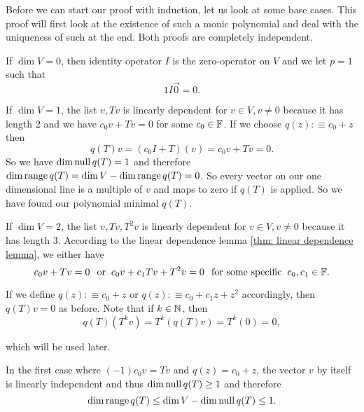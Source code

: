 \begin{prf}
  Before we can start our proof with induction, let us look at some base cases. This proof will first look at the existence of such a monic polynomial and deal with the uniqueness of such at the end. Both proofs are completely independent.

  If $\dim V=0$, then identity operator $I$ is the zero-operator on $V$ and we let $p=1$ such that
  \begin{equation}
      1I\vec0=0.
  \end{equation}

  If $\dim V=1$, the list $v, Tv$ is linearly dependent for $v \in V, v\neq 0$ because it has length $2$ and we have $c_0v + Tv = 0$ for some $c_0 \in \mathbb{F}$. If we choose $q(z) :\equiv c_0+z$ then
  \begin{equation}
    q(T)v=(c_0 I+T)(v)=c_0v+Tv=0.
  \end{equation}
  So we have $\dim \operatorname{null} q(T) = 1$ and therefore $\dim \operatorname{range} q(T) = \dim V - \dim \operatorname{range} q(T) = 0$. So every vector on our one dimensional line is a multiple of $v$ and maps to zero if $q(T)$ is applied. So we have found our polynomial minimal $q(T)$.

  If $\dim V=2$, the list $v, Tv, T^2v$ is linearly dependent for $v\in V, v\neq0$ because it has length $3$. According to the linear dependence lemma \ref{thm: linear dependence lemma}, we either have
 \begin{equation}
     c_0v + Tv = 0 \;\;\, \text{or}\;\;
     c_0v + c_1Tv + T^2v = 0 \;\;\, \text{for some specific}\;\; c_0, c_1 \in  \mathbb{F}.
 \end{equation}

  If we define $q(z) :\equiv c_0+z$ or $q(z) :\equiv c_0+c_1z+z^2$
  accordingly, then $q(T)v=0$ as before. Note that if $k \in \mathbb{N}$, then
  \begin{equation}
    \label{eq: nice equation for q(t)}
    q(T)(T^kv)=T^k(q(T)v) =T^k (0) =0,
  \end{equation}

  which will be used later.

  In the first case where $(-1)c_0v=Tv$ and $q(z)=c_0+z$, the vector $v$ by itself is linearly independent and thus $\dim \operatorname{null} q(T) \geq 1$ and therefore
  \begin{equation}
    \dim \operatorname{range} q(T) \leq \dim V - \dim \operatorname{null} q(T) \leq 1.
  \end{equation}


\end{prf}
